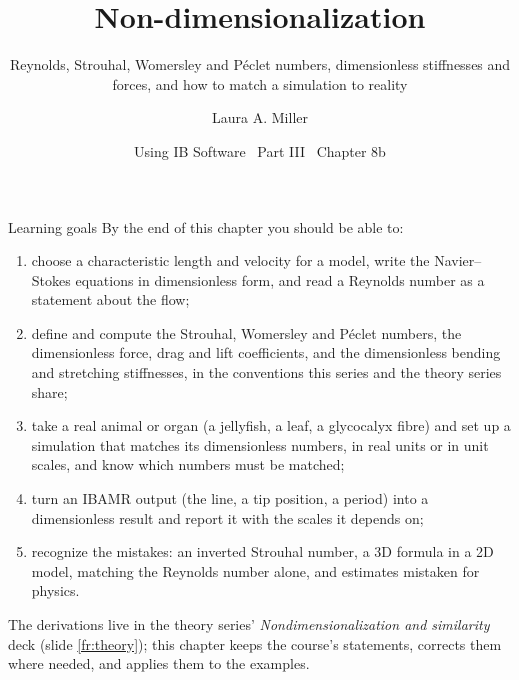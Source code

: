 \documentclass[aspectratio=169,11pt]{beamer}
\title[Non-dimensionalization]{Non-dimensionalization}
\subtitle{Reynolds, Strouhal, Womersley and P\'eclet numbers, dimensionless stiffnesses and forces, and how to match a simulation to reality}
\author[Miller]{Laura A. Miller}
\institute[UArizona]{Department of Mathematics, University of Arizona}
\date{Using IB Software \textbullet\ Part III \textbullet\ Chapter 8b}
\begin{document}
\begin{frame}[plain]
\end{frame}

\begin{frame}{Learning goals}
\label{fr:goals}
\small By the end of this chapter you should be able to:
\begin{enumerate}
  \item choose a characteristic length and velocity for a model, write the Navier--Stokes equations in dimensionless form, and read a Reynolds number as a statement about the flow;
  \item define and compute the Strouhal, Womersley and P\'eclet numbers, the dimensionless force, drag and lift coefficients, and the dimensionless bending and stretching stiffnesses, in the conventions this series and the theory series share;
  \item take a real animal or organ (a jellyfish, a leaf, a glycocalyx fibre) and set up a simulation that matches its dimensionless numbers, in real units or in unit scales, and know which numbers must be matched;
  \item turn an IBAMR output (the  line, a tip position, a period) into a dimensionless result and report it with the scales it depends on;
  \item recognize the mistakes: an inverted Strouhal number, a 3D formula in a 2D model, matching the Reynolds number alone, and estimates mistaken for physics.
\end{enumerate}
\begin{punchbox}
\footnotesize The derivations live in the theory series' \emph{Nondimensionalization and similarity} deck (slide \ref{fr:theory}); this chapter keeps the course's statements, corrects them where needed, and applies them to the examples.
\end{punchbox}
\end{frame}
\end{document}
